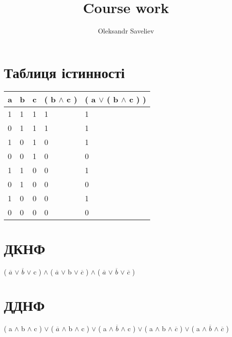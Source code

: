 \documentclass{article}
\title{Course work}
\author{Oleksandr Saveliev}
\begin{document}
\maketitle 
\section{Таблиця істинності}
\begin{tabular}{ | l | l | l | l | l |}
\hline 
a & b & c & ( b $\land$ c ) & ( a $\vee$ ( b $\land$ c ) )  \\ \hline
1 & 1 & 1 & 1 & 1  \\
0 & 1 & 1 & 1 & 1  \\
1 & 0 & 1 & 0 & 1  \\
0 & 0 & 1 & 0 & 0  \\
1 & 1 & 0 & 0 & 1  \\
0 & 1 & 0 & 0 & 0  \\
1 & 0 & 0 & 0 & 1  \\
0 & 0 & 0 & 0 & 0  \\
\hline
\end{tabular}
\section{ДКНФ}
 ( $\overline{a}$ $\vee $ $\overline{b}$ $\vee $ c ) $\land$ ( $\overline{a}$ $\vee $ b $\vee $ $\overline{c}$ ) $\land$ ( $\overline{a}$ $\vee $ $\overline{b}$ $\vee $ $\overline{c}$ )
\section{ДДНФ}
 ( a $\land$ b $\land$ c ) $\vee $ ( $\overline{a}$ $\land$ b $\land$ c ) $\vee $ ( a $\land$ $\overline{b}$ $\land$ c ) $\vee $ ( a $\land$ b $\land$ $\overline{c}$ ) $\vee $ ( a $\land$ $\overline{b}$ $\land$ $\overline{c}$ )
\end{document}
